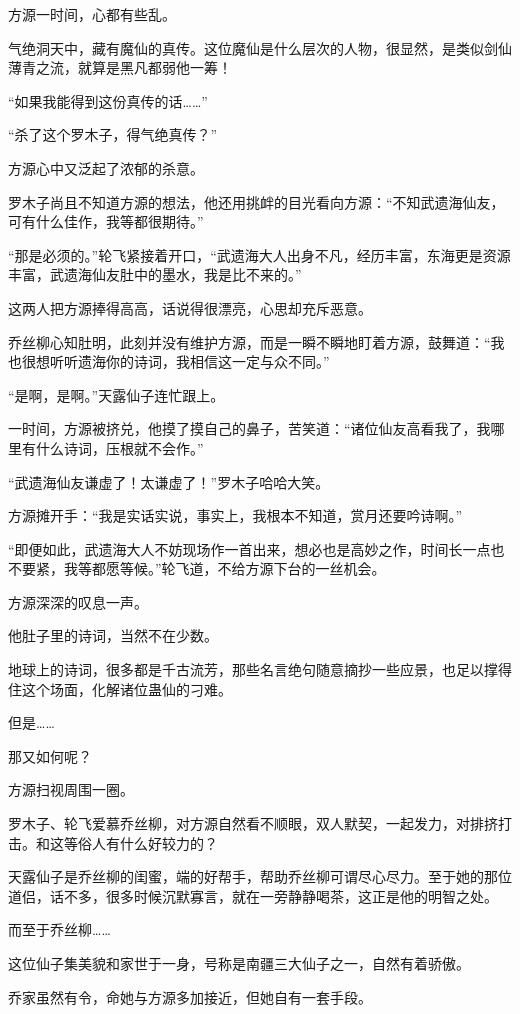\begin{this_body}
方源一时间，心都有些乱。

气绝洞天中，藏有魔仙的真传。这位魔仙是什么层次的人物，很显然，是类似剑仙薄青之流，就算是黑凡都弱他一筹！

“如果我能得到这份真传的话……”

“杀了这个罗木子，得气绝真传？”

方源心中又泛起了浓郁的杀意。

罗木子尚且不知道方源的想法，他还用挑衅的目光看向方源：“不知武遗海仙友，可有什么佳作，我等都很期待。”

“那是必须的。”轮飞紧接着开口，“武遗海大人出身不凡，经历丰富，东海更是资源丰富，武遗海仙友肚中的墨水，我是比不来的。”

这两人把方源捧得高高，话说得很漂亮，心思却充斥恶意。

乔丝柳心知肚明，此刻并没有维护方源，而是一瞬不瞬地盯着方源，鼓舞道：“我也很想听听遗海你的诗词，我相信这一定与众不同。”

“是啊，是啊。”天露仙子连忙跟上。

一时间，方源被挤兑，他摸了摸自己的鼻子，苦笑道：“诸位仙友高看我了，我哪里有什么诗词，压根就不会作。”

“武遗海仙友谦虚了！太谦虚了！”罗木子哈哈大笑。

方源摊开手：“我是实话实说，事实上，我根本不知道，赏月还要吟诗啊。”

“即便如此，武遗海大人不妨现场作一首出来，想必也是高妙之作，时间长一点也不要紧，我等都愿等候。”轮飞道，不给方源下台的一丝机会。

方源深深的叹息一声。

他肚子里的诗词，当然不在少数。

地球上的诗词，很多都是千古流芳，那些名言绝句随意摘抄一些应景，也足以撑得住这个场面，化解诸位蛊仙的刁难。

但是……

那又如何呢？

方源扫视周围一圈。

罗木子、轮飞爱慕乔丝柳，对方源自然看不顺眼，双人默契，一起发力，对排挤打击。和这等俗人有什么好较力的？

天露仙子是乔丝柳的闺蜜，端的好帮手，帮助乔丝柳可谓尽心尽力。至于她的那位道侣，话不多，很多时候沉默寡言，就在一旁静静喝茶，这正是他的明智之处。

而至于乔丝柳……

这位仙子集美貌和家世于一身，号称是南疆三大仙子之一，自然有着骄傲。

乔家虽然有令，命她与方源多加接近，但她自有一套手段。


\end{this_body}
